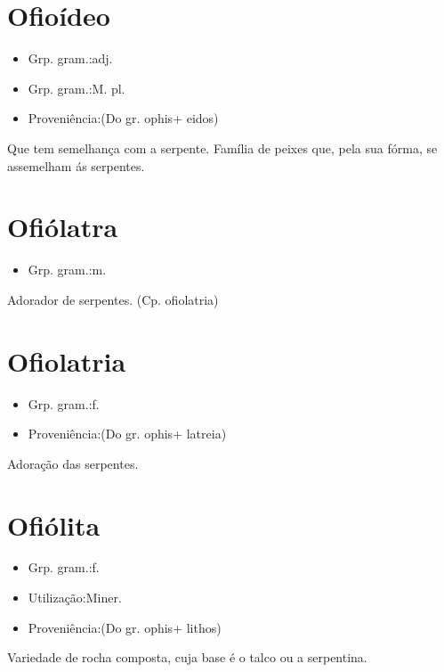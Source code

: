 \section{Ofioídeo}
\begin{itemize}
\item {Grp. gram.:adj.}
\end{itemize}
\begin{itemize}
\item {Grp. gram.:M. pl.}
\end{itemize}
\begin{itemize}
\item {Proveniência:(Do gr. \textunderscore ophis\textunderscore  + \textunderscore eidos\textunderscore )}
\end{itemize}
Que tem semelhança com a serpente.
Família de peixes que, pela sua fórma, se assemelham ás serpentes.
\section{Ofiólatra}
\begin{itemize}
\item {Grp. gram.:m.}
\end{itemize}
Adorador de serpentes.
(Cp. \textunderscore ofiolatria\textunderscore )
\section{Ofiolatria}
\begin{itemize}
\item {Grp. gram.:f.}
\end{itemize}
\begin{itemize}
\item {Proveniência:(Do gr. \textunderscore ophis\textunderscore  + \textunderscore latreia\textunderscore )}
\end{itemize}
Adoração das serpentes.
\section{Ofiólita}
\begin{itemize}
\item {Grp. gram.:f.}
\end{itemize}
\begin{itemize}
\item {Utilização:Miner.}
\end{itemize}
\begin{itemize}
\item {Proveniência:(Do gr. \textunderscore ophis\textunderscore  + \textunderscore lithos\textunderscore )}
\end{itemize}
Variedade de rocha composta, cuja base é o talco ou a serpentina.
